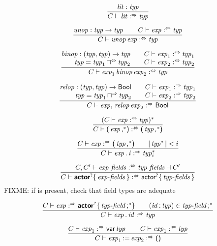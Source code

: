 $$
\frac{
  \x{lit} : \x{typ}
}{
  C \vdash \x{lit} \synth \x{typ}
}
$$

$$
\frac{
  \x{unop} : \x{typ} \Kto \x{typ}
  \qquad
  C \vdash \x{exp} \analsynth \x{typ}
}{
  C \vdash \x{unop} \x{exp} \analsynth \x{typ}
}
$$

$$
\frac{
  \begin{array}{@{}r@{}}
  \x{binop} : (\x{typ}, \x{typ}) \Kto \x{typ}
  \\
  \x{typ} = \x{typ}_1 \meetanalsynth \x{typ}_2
  \end{array}
  \qquad
  \begin{array}{@{}r@{}}
  C \vdash \x{exp}_1 \analsynth \x{typ}_1
  \\
  C \vdash \x{exp}_2 \analsynth \x{typ}_2
  \end{array}
}{
  C \vdash \x{exp}_1 \x{binop} \x{exp}_2 \analsynth \x{typ}
}
$$

$$
\frac{
  \begin{array}{@{}r@{}}
  \x{relop} : (\x{typ}, \x{typ}) \Kto \K{Bool}
  \\
  \x{typ} = \x{typ}_1 \meetsynth \x{typ}_2
  \end{array}
  \qquad
  \begin{array}{@{}r@{}}
  C \vdash \x{exp}_1 \synth \x{typ}_1
  \\
  C \vdash \x{exp}_2 \synth \x{typ}_2
  \end{array}
}{
  C \vdash \x{exp}_1 \x{relop} \x{exp}_2 \synth \K{Bool}
}
$$

$$
\frac{
  (C \vdash \x{exp} \analsynth \x{typ})^\ast
}{
  C \vdash \K( \x{exp}\K,^\ast \K) \analsynth \K( \x{typ}\K,^\ast \K)
}
$$

$$
\frac{
  C \vdash \x{exp} \synth \K( \x{typ}\K,^\ast \K)
  \qquad
  |\x{typ}^\ast| < i
}{
  C \vdash \x{exp} \K. \x{i} \synth \x{typ}^\ast_i
}
$$

$$
\frac{
  C, C' \vdash \x{exp-fields} \analsynth \x{typ-fields} \dashv C'
}{
  C \vdash \KK{actor}^? \K\{ \x{exp-fields} \K\} \analsynth \K{actor}^? \K\{ \x{typ-fields} \K\}
}
$$
FIXME: if  is present, check that field types are adequate

$$
\frac{
  C \vdash \x{exp} \synth \KK{actor}^? \K\{ \x{typ-field}\K;^\ast \K\}
  \qquad
  (\x{id} \K: \x{typ}) \in \x{typ-field}\K;^\ast
}{
  C \vdash \x{exp} \K. \x{id} \synth \x{typ}
}
$$

$$
\frac{
  C \vdash \x{exp}_1 \synth \K{var} \x{typ}
  \qquad
  C \vdash \x{exp}_1 \anal \x{typ}
}{
  C \vdash \x{exp}_1 \K{:=} \x{exp}_2 \synth \K{()}
}
$$

